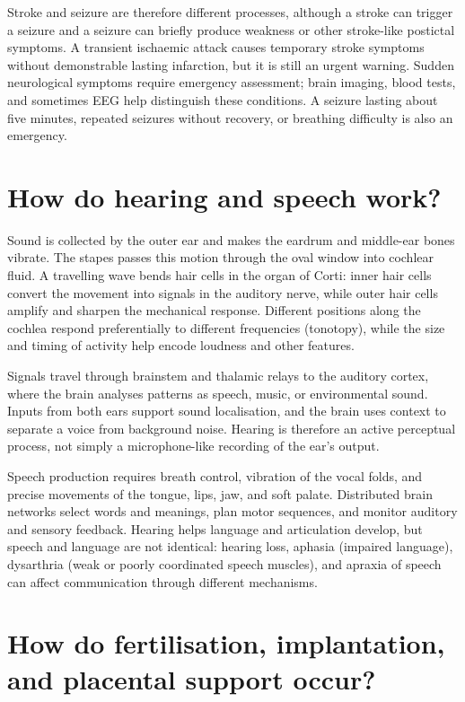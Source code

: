 \documentclass[11pt,oneside]{report}
\begin{document}
Stroke and seizure are therefore different processes, although a stroke can
trigger a seizure and a seizure can briefly produce weakness or other
stroke-like postictal symptoms. A transient ischaemic attack causes temporary
stroke symptoms without demonstrable lasting infarction, but it is still an
urgent warning. Sudden neurological symptoms require emergency assessment;
brain imaging, blood tests, and sometimes EEG help distinguish these conditions.
A seizure lasting about five minutes, repeated seizures without recovery, or
breathing difficulty is also an emergency.

\section{How do hearing and speech work?}

Sound is collected by the outer ear and makes the eardrum and middle-ear bones
vibrate. The stapes passes this motion through the oval window into cochlear
fluid. A travelling wave bends hair cells in the organ of Corti: inner hair
cells convert the movement into signals in the auditory nerve, while outer hair
cells amplify and sharpen the mechanical response. Different positions along
the cochlea respond preferentially to different frequencies (tonotopy), while
the size and timing of activity help encode loudness and other features.

Signals travel through brainstem and thalamic relays to the auditory cortex,
where the brain analyses patterns as speech, music, or environmental sound.
Inputs from both ears support sound localisation, and the brain uses context
to separate a voice from background noise. Hearing is therefore an active
perceptual process, not simply a microphone-like recording of the ear's output.

Speech production requires breath control, vibration of the vocal folds, and
precise movements of the tongue, lips, jaw, and soft palate. Distributed brain
networks select words and meanings, plan motor sequences, and monitor auditory
and sensory feedback. Hearing helps language and articulation develop, but
speech and language are not identical: hearing loss, aphasia (impaired
language), dysarthria (weak or poorly coordinated speech muscles), and apraxia
of speech can affect communication through different mechanisms.

\section{How do fertilisation, implantation, and placental support occur?}
\end{document}
